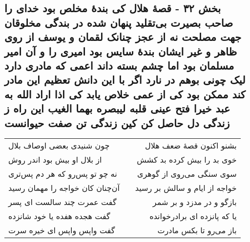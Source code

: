 \begin{center}
\section*{بخش ۳۲ - قصهٔ هلال کی بندهٔ مخلص بود خدای را صاحب بصیرت بی‌تقلید پنهان شده در بندگی مخلوقان جهت مصلحت نه از عجز چنانک لقمان و یوسف از روی ظاهر و غیر ایشان بندهٔ سایس بود امیری را و آن امیر مسلمان بود اما چشم بسته داند اعمی که مادری دارد لیک چونی بوهم در نارد اگر با این دانش تعظیم این مادر کند ممکن بود کی از عمی خلاص یابد کی اذا اراد الله به عبد خیرا فتح عینی قلبه لیبصره بهما الغیب این راه ز زندگی دل حاصل کن کین زندگی تن صفت حیوانست}
\label{sec:sh032}
\begin{longtable}{l p{0.5cm} r}
چون شنیدی بعضی اوصاف بلال
&&
بشنو اکنون قصهٔ ضعف هلال
\\
از بلال او بیش بود اندر روش
&&
خوی بد را بیش کرده بد کشش
\\
نه چو تو پس‌رو که هر دم پس‌تری
&&
سوی سنگی می‌روی از گوهری
\\
آن‌چنان کان خواجه را مهمان رسید
&&
خواجه از ایام و سالش بر رسید
\\
گفت عمرت چند سالست ای پسر
&&
بازگو و در مدزد و بر شمر
\\
گفت هجده هفده یا خود شانزده
&&
یا که پانزده ای برادرخوانده
\\
گفت واپس واپس ای خیره سرت
&&
باز می‌رو تا بکس مادرت
\\
\end{longtable}
\end{center}
